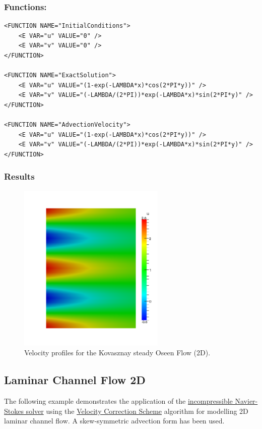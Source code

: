 \subsubsection{Functions:~} 
\begin{lstlisting}[style=XMLStyle]
<FUNCTION NAME="InitialConditions">
	<E VAR="u" VALUE="0" />
	<E VAR="v" VALUE="0" />
</FUNCTION>

<FUNCTION NAME="ExactSolution">
	<E VAR="u" VALUE="(1-exp(-LAMBDA*x)*cos(2*PI*y))" />
	<E VAR="v" VALUE="(-LAMBDA/(2*PI))*exp(-LAMBDA*x)*sin(2*PI*y)" />
</FUNCTION>

<FUNCTION NAME="AdvectionVelocity">
	<E VAR="u" VALUE="(1-exp(-LAMBDA*x)*cos(2*PI*y))" />
	<E VAR="v" VALUE="(-LAMBDA/(2*PI))*exp(-LAMBDA*x)*sin(2*PI*y)" />
</FUNCTION>
\end{lstlisting}

\subsubsection{Results}

\begin{figure}
\begin{center}
\includegraphics[width=7cm]{Figures/KV2DOSP8.png}
\caption{Velocity profiles for the Kovasznay steady Oseen Flow (2D).}
\end{center}
\end{figure}

\subsection{Laminar Channel Flow 2D}
\label{LaminarChannelFlow2D}
The following example demonstrates the application of the \hyperref[IncNSsolver]{incompressible Navier-Stokes solver} using the \hyperref[VCSscheme]{Velocity Correction Scheme} algorithm for modelling 2D laminar channel flow. A skew-symmetric advection form has been used.

